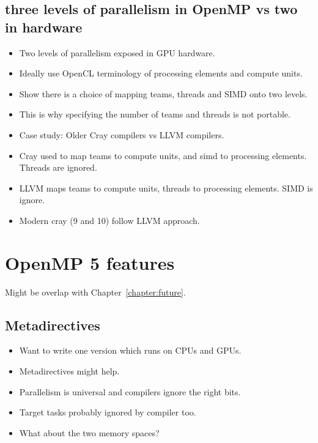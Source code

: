 \subsection{three levels of parallelism in OpenMP vs two in hardware}
\begin{itemize}
  \item Two levels of parallelism exposed in GPU hardware.
  \item Ideally use OpenCL terminology of processing elements and compute units.
  \item Show there is a choice of mapping teams, threads and SIMD onto two levels.
  \item This is why specifying the number of teams and threads is not portable.
  \item Case study: Older Cray compilers vs LLVM compilers.
  \item Cray used to map teams to compute units, and simd to processing elements. Threads are ignored.
  \item LLVM maps teams to compute units, threads to processing elements. SIMD is ignore.
  \item Modern cray (9 and 10) follow LLVM approach.
\end{itemize}

\section{OpenMP 5 features}
Might be overlap with Chapter~\ref{chapter:future}.

\subsection{Metadirectives}
\begin{itemize}
  \item Want to write one version which runs on CPUs and GPUs.
  \item Metadirectives might help.
  \item Parallelism is universal and compilers ignore the right bits.
  \item Target tasks probably ignored by compiler too.
  \item What about the two memory spaces?
\end{itemize}


